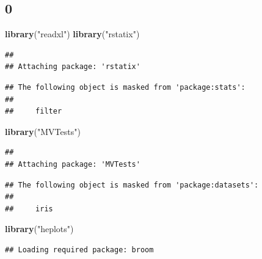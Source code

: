 \documentclass[
]{ctexart}
\newenvironment{Shaded}{\begin{snugshade}}{\end{snugshade}}
\newcommand{\CommentTok}[1]{\textcolor[rgb]{0.56,0.35,0.01}{\textit{#1}}}
\newcommand{\FunctionTok}[1]{\textcolor[rgb]{0.13,0.29,0.53}{\textbf{#1}}}
\newcommand{\NormalTok}[1]{#1}
\newcommand{\OtherTok}[1]{\textcolor[rgb]{0.56,0.35,0.01}{#1}}
\newcommand{\SpecialCharTok}[1]{\textcolor[rgb]{0.81,0.36,0.00}{\textbf{#1}}}
\newcommand{\StringTok}[1]{\textcolor[rgb]{0.31,0.60,0.02}{#1}}
\begin{document}
\hypertarget{section-1}{%
\subsection{0}\label{section-1}}

\begin{Shaded}
\begin{Highlighting}[]
\FunctionTok{library}\NormalTok{(}\StringTok{"readxl"}\NormalTok{)}
\FunctionTok{library}\NormalTok{(}\StringTok{"rstatix"}\NormalTok{)}
\end{Highlighting}
\end{Shaded}

\begin{verbatim}
## 
## Attaching package: 'rstatix'
\end{verbatim}

\begin{verbatim}
## The following object is masked from 'package:stats':
## 
##     filter
\end{verbatim}

\begin{Shaded}
\begin{Highlighting}[]
\FunctionTok{library}\NormalTok{(}\StringTok{"MVTests"}\NormalTok{)}
\end{Highlighting}
\end{Shaded}

\begin{verbatim}
## 
## Attaching package: 'MVTests'
\end{verbatim}

\begin{verbatim}
## The following object is masked from 'package:datasets':
## 
##     iris
\end{verbatim}

\begin{Shaded}
\begin{Highlighting}[]
\FunctionTok{library}\NormalTok{(}\StringTok{"heplots"}\NormalTok{)}
\end{Highlighting}
\end{Shaded}

\begin{verbatim}
## Loading required package: broom
\end{verbatim}

\begin{Shaded}
\end{Shaded}
\end{document}
